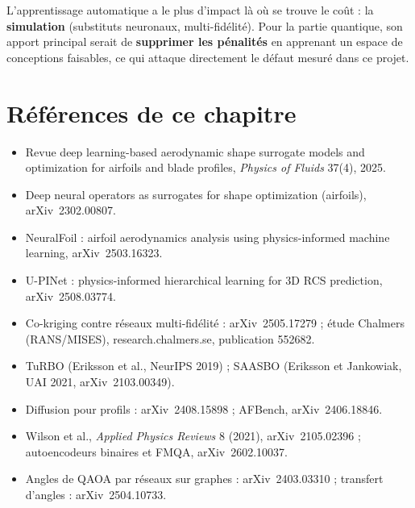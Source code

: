 \begin{resultat}
L'apprentissage automatique a le plus d'impact là où se trouve le coût : la \textbf{simulation} (substituts neuronaux, multi-fidélité). Pour la partie quantique, son apport principal serait de \textbf{supprimer les pénalités} en apprenant un espace de conceptions faisables, ce qui attaque directement le défaut mesuré dans ce projet.
\end{resultat}

\section*{Références de ce chapitre}
\begin{itemize}\small
\item Revue \og deep learning-based aerodynamic shape surrogate models and optimization for airfoils and blade profiles\fg{}, \emph{Physics of Fluids} 37(4), 2025.
\item Deep neural operators as surrogates for shape optimization (airfoils), arXiv~2302.00807.
\item NeuralFoil : airfoil aerodynamics analysis using physics-informed machine learning, arXiv~2503.16323.
\item U-PINet : physics-informed hierarchical learning for 3D RCS prediction, arXiv~2508.03774.
\item Co-kriging contre réseaux multi-fidélité : arXiv~2505.17279 ; étude Chalmers (RANS/MISES), research.chalmers.se, publication 552682.
\item TuRBO (Eriksson et al., NeurIPS 2019) ; SAASBO (Eriksson et Jankowiak, UAI 2021, arXiv~2103.00349).
\item Diffusion pour profils : arXiv~2408.15898 ; AFBench, arXiv~2406.18846.
\item Wilson et al., \emph{Applied Physics Reviews} 8 (2021), arXiv~2105.02396 ; autoencodeurs binaires et FMQA, arXiv~2602.10037.
\item Angles de QAOA par réseaux sur graphes : arXiv~2403.03310 ; transfert d'angles : arXiv~2504.10733.
\end{itemize}
